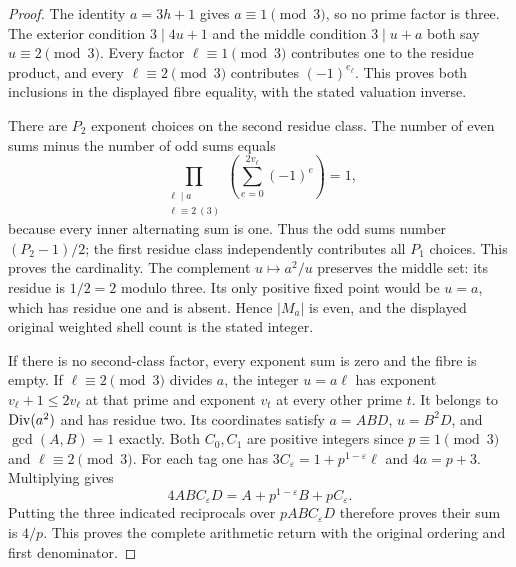 \begin{proof}
The identity \(a=3h+1\) gives \(a\equiv1\pmod3\), so no prime
factor is three. The exterior condition \(3\mid4u+1\) and the
middle condition \(3\mid u+a\) both say \(u\equiv2\pmod3\).
Every factor \(\ell\equiv1\pmod3\) contributes one to the
residue product, and every \(\ell\equiv2\pmod3\) contributes
\((-1)^{e_\ell}\). This proves both inclusions in the displayed
fibre equality, with the stated valuation inverse.

There are \(P_2\) exponent choices on the second residue class.
The number of even sums minus the number of odd sums equals
\[
 \prod_{\substack{\ell\mid a\\\ell\equiv2\ (3)}}
       \left(\sum_{e=0}^{2v_\ell}(-1)^e\right)=1,
\]
because every inner alternating sum is one. Thus the odd sums
number \((P_2-1)/2\); the first residue class independently
contributes all \(P_1\) choices. This proves the cardinality.
The complement \(u\mapsto a^2/u\) preserves the middle set:
its residue is \(1/2=2\) modulo three. Its only positive fixed
point would be \(u=a\), which has residue one and is absent.
Hence \(|M_a|\) is even, and the displayed original weighted
shell count is the stated integer.

If there is no second-class factor, every exponent sum is zero
and the fibre is empty. If \(\ell\equiv2\pmod3\) divides \(a\),
the integer \(u=a\ell\) has exponent \(v_\ell+1\le2v_\ell\)
at that prime and exponent \(v_t\) at every other prime \(t\).
It belongs to \(\operatorname{Div}(a^2)\) and has residue two. Its coordinates
satisfy \(a=ABD\), \(u=B^2D\), and \(\gcd(A,B)=1\) exactly.
Both \(C_0,C_1\) are positive integers since \(p\equiv1\pmod3\)
and \(\ell\equiv2\pmod3\). For each tag one has
\(3C_\varepsilon=1+p^{1-\varepsilon}\ell\) and
\(4a=p+3\). Multiplying gives
\[
 4AB C_\varepsilon D
   =A+p^{1-\varepsilon}B+pC_\varepsilon.
\]
Putting the three indicated reciprocals over \(pAB C_\varepsilon D\)
therefore proves their sum is \(4/p\). This proves the complete
arithmetic return with the original ordering and first denominator.
\end{proof}

